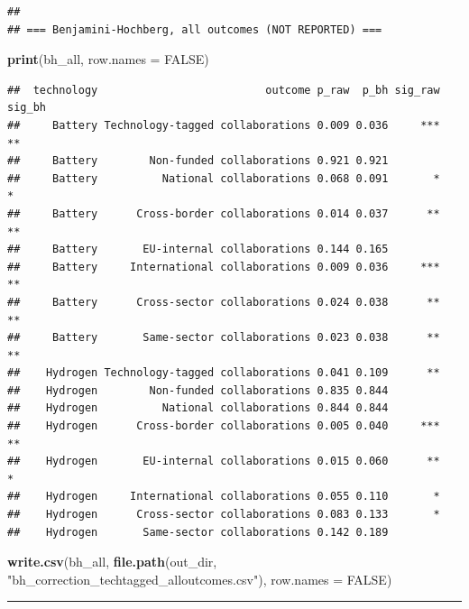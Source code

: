 \documentclass[
]{article}
\newenvironment{Shaded}{\begin{snugshade}}{\end{snugshade}}
\newcommand{\AttributeTok}[1]{\textcolor[rgb]{0.13,0.29,0.53}{#1}}
\newcommand{\ConstantTok}[1]{\textcolor[rgb]{0.56,0.35,0.01}{#1}}
\newcommand{\FunctionTok}[1]{\textcolor[rgb]{0.13,0.29,0.53}{\textbf{#1}}}
\newcommand{\NormalTok}[1]{#1}
\newcommand{\StringTok}[1]{\textcolor[rgb]{0.31,0.60,0.02}{#1}}
\begin{document}
\begin{verbatim}
## 
## === Benjamini-Hochberg, all outcomes (NOT REPORTED) ===
\end{verbatim}

\begin{Shaded}
\begin{Highlighting}[]
\FunctionTok{print}\NormalTok{(bh\_all, }\AttributeTok{row.names =} \ConstantTok{FALSE}\NormalTok{)}
\end{Highlighting}
\end{Shaded}

\begin{verbatim}
##  technology                          outcome p_raw  p_bh sig_raw sig_bh
##     Battery Technology-tagged collaborations 0.009 0.036     ***     **
##     Battery        Non-funded collaborations 0.921 0.921               
##     Battery          National collaborations 0.068 0.091       *      *
##     Battery      Cross-border collaborations 0.014 0.037      **     **
##     Battery       EU-internal collaborations 0.144 0.165               
##     Battery     International collaborations 0.009 0.036     ***     **
##     Battery      Cross-sector collaborations 0.024 0.038      **     **
##     Battery       Same-sector collaborations 0.023 0.038      **     **
##    Hydrogen Technology-tagged collaborations 0.041 0.109      **       
##    Hydrogen        Non-funded collaborations 0.835 0.844               
##    Hydrogen          National collaborations 0.844 0.844               
##    Hydrogen      Cross-border collaborations 0.005 0.040     ***     **
##    Hydrogen       EU-internal collaborations 0.015 0.060      **      *
##    Hydrogen     International collaborations 0.055 0.110       *       
##    Hydrogen      Cross-sector collaborations 0.083 0.133       *       
##    Hydrogen       Same-sector collaborations 0.142 0.189
\end{verbatim}

\begin{Shaded}
\begin{Highlighting}[]
\FunctionTok{write.csv}\NormalTok{(bh\_all,}
          \FunctionTok{file.path}\NormalTok{(out\_dir, }\StringTok{"bh\_correction\_techtagged\_alloutcomes.csv"}\NormalTok{),}
          \AttributeTok{row.names =} \ConstantTok{FALSE}\NormalTok{)}
\end{Highlighting}
\end{Shaded}

\begin{center}\rule{0.5\linewidth}{0.5pt}\end{center}
\end{document}
